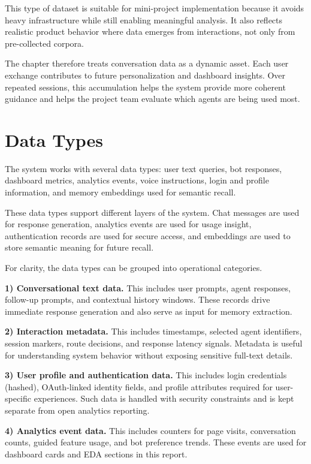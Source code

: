 \documentclass[oneside,a4paper,12pt]{report}
\begin{document}
This type of dataset is suitable for mini-project implementation because it avoids heavy infrastructure while still enabling meaningful analysis. It also reflects realistic product behavior where data emerges from interactions, not only from pre-collected corpora.

The chapter therefore treats conversation data as a dynamic asset. Each user exchange contributes to future personalization and dashboard insights. Over repeated sessions, this accumulation helps the system provide more coherent guidance and helps the project team evaluate which agents are being used most.

\section{Data Types}
The system works with several data types: user text queries, bot responses, dashboard metrics, analytics events, voice instructions, login and profile information, and memory embeddings used for semantic recall.

These data types support different layers of the system. Chat messages are used for response generation, analytics events are used for usage insight, authentication records are used for secure access, and embeddings are used to store semantic meaning for future recall.

For clarity, the data types can be grouped into operational categories.

\textbf{1) Conversational text data.} This includes user prompts, agent responses, follow-up prompts, and contextual history windows. These records drive immediate response generation and also serve as input for memory extraction.

\textbf{2) Interaction metadata.} This includes timestamps, selected agent identifiers, session markers, route decisions, and response latency signals. Metadata is useful for understanding system behavior without exposing sensitive full-text details.

\textbf{3) User profile and authentication data.} This includes login credentials (hashed), OAuth-linked identity fields, and profile attributes required for user-specific experiences. Such data is handled with security constraints and is kept separate from open analytics reporting.

\textbf{4) Analytics event data.} This includes counters for page visits, conversation counts, guided feature usage, and bot preference trends. These events are used for dashboard cards and EDA sections in this report.
\end{document}
